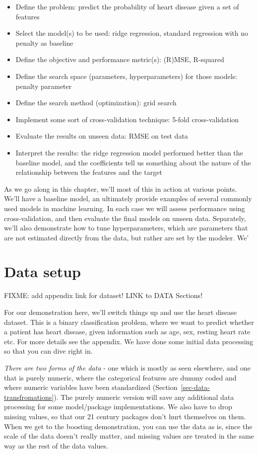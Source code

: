 \documentclass[
  letterpaper,
]{krantz}
\providecommand{\tightlist}{%
  \setlength{\itemsep}{0pt}\setlength{\parskip}{0pt}}\usepackage{longtable,booktabs,array}
\begin{document}
\begin{itemize}
\tightlist
\item
  Define the problem: predict the probability of heart disease given a
  set of features
\item
  Select the model(s) to be used: ridge regression, standard regression
  with no penalty as baseline
\item
  Define the objective and performance metric(s): (R)MSE, R-squared
\item
  Define the search space (parameters, hyperparameters) for those
  models: penalty parameter
\item
  Define the search method (optimization): grid search
\item
  Implement some sort of cross-validation technique: 5-fold
  cross-validation
\item
  Evaluate the results on unseen data: RMSE on test data
\item
  Interpret the results: the ridge regression model performed better
  than the baseline model, and the coefficients tell us something about
  the nature of the relationship between the features and the target
\end{itemize}

As we go along in this chapter, we'll most of this in action at various
points. We'll have a baseline model, an ultimately provide examples of
several commonly used models in machine learning. In each case we will
assess performance using cross-validation, and then evaluate the final
models on unseen data. Separately, we'll also demonstrate how to tune
hyperparameters, which are parameters that are not estimated directly
from the data, but rather are set by the modeler. We'

\section{Data setup}\label{data-setup-1}

FIXME: add appendix link for dataset! LINK to DATA Sections!

For our demonstration here, we'll switch things up and use the heart
disease dataset. This is a binary classification problem, where we want
to predict whether a patient has heart disease, given information such
as age, sex, resting heart rate etc. For more details see the appendix.
We have done some initial data processing so that you can dive right in.

\emph{There are two forms of the data} - one which is mostly as seen
elsewhere, and one that is purely numeric, where the categorical
features are dummy coded and where numeric variables have been
standardized (Section~\ref{sec-data-transfromations}). The purely
numeric version will save any additional data processing for some
model/package implementations. We also have to drop missing values, so
that our 21 century packages don't hurt themselves on them. When we get
to the boosting demonstration, you can use the data as is, since the
scale of the data doesn't really matter, and missing values are treated
in the same way as the rest of the data values.
\end{document}
